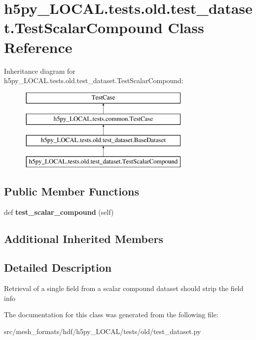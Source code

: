 \hypertarget{classh5py__LOCAL_1_1tests_1_1old_1_1test__dataset_1_1TestScalarCompound}{}\section{h5py\+\_\+\+L\+O\+C\+A\+L.\+tests.\+old.\+test\+\_\+dataset.\+Test\+Scalar\+Compound Class Reference}
\label{classh5py__LOCAL_1_1tests_1_1old_1_1test__dataset_1_1TestScalarCompound}
Inheritance diagram for h5py\+\_\+\+L\+O\+C\+A\+L.\+tests.\+old.\+test\+\_\+dataset.\+Test\+Scalar\+Compound\+:\begin{figure}[H]
\begin{center}
\leavevmode
\includegraphics[height=4.000000cm]{classh5py__LOCAL_1_1tests_1_1old_1_1test__dataset_1_1TestScalarCompound}
\end{center}
\end{figure}
\subsection*{Public Member Functions}
\begin{DoxyCompactItemize}
\item 
\mbox{\label{classh5py__LOCAL_1_1tests_1_1old_1_1test__dataset_1_1TestScalarCompound_a7989970840b35463feb4f69a97551a83}} 
def {\bfseries test\+\_\+scalar\+\_\+compound} (self)
\end{DoxyCompactItemize}
\subsection*{Additional Inherited Members}


\subsection{Detailed Description}
\begin{DoxyVerb}    Retrieval of a single field from a scalar compound dataset should
    strip the field info
\end{DoxyVerb}
 

The documentation for this class was generated from the following file\+:\begin{DoxyCompactItemize}
\item 
src/mesh\+\_\+formats/hdf/h5py\+\_\+\+L\+O\+C\+A\+L/tests/old/test\+\_\+dataset.\+py\end{DoxyCompactItemize}
